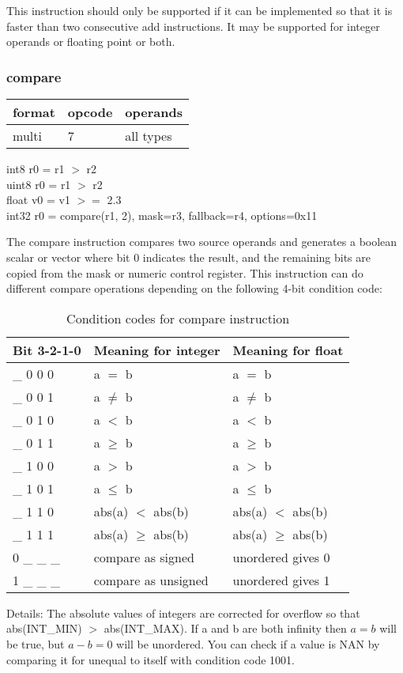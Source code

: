 \documentclass[forwardcom.tex]{subfiles}
\begin{document}
This instruction should only be supported if it can be implemented so that it is faster than two consecutive add instructions. It may be supported for integer operands or floating point or both.

\subsubsection{compare} \label{compare}
\label{table:compareInstruction}
\begin{tabular}{|p{12mm}|p{12mm}|p{110mm}|}
\hline
\bfseries format & \bfseries opcode & \bfseries operands \\ \hline
multi &  7 & all types \\ \hline
\end{tabular}
\vspace{2mm}

int8 r0 = r1 $>$ r2 \\
uint8 r0 = r1 $>$ r2 \\
float v0 = v1 $>=$ 2.3 \\
int32 r0 = compare(r1, 2), mask=r3, fallback=r4, options=0x11
\vspace{2mm}

The compare instruction compares two source operands and generates a boolean scalar or vector where bit 0 indicates the result, and the remaining bits are copied from the mask or numeric control register. This instruction can do different compare operations depending on the following 4-bit condition code:

\begin{longtable} {|p{14mm}|p{55mm}|p{55mm}|}
\caption{Condition codes for compare instruction} 
\label{table:conditionCodesForCompareInstruction} \\
\endfirsthead
\endhead
\hline
\bfseries Bit 3-2-1-0 & \bfseries Meaning for integer & \bfseries Meaning for float \\
\hline
\_ 0 0 0 & a $=$ b & a $=$ b \\
\_ 0 0 1 & a $\neq$ b & a $\neq$ b \\
\_ 0 1 0 & a $<$ b & a $<$ b \\
\_ 0 1 1 & a $\geq$ b & a $\geq$ b \\
\_ 1 0 0 & a $>$ b & a $>$ b \\
\_ 1 0 1 & a $\leq$ b & a $\leq$ b \\
\_ 1 1 0 & abs(a) $<$ abs(b) & abs(a) $<$ abs(b) \\
\_ 1 1 1 & abs(a) $\geq$ abs(b) & abs(a) $\geq$ abs(b) \\
\hline
0 \_ \_ \_ & compare as signed & unordered gives 0 \\
1 \_ \_ \_ & compare as unsigned & unordered gives 1 \\
\hline
\end{longtable}
Details: The absolute values of integers are corrected for overflow so that abs(INT\_MIN) $>$ abs(INT\_MAX).
If a and b are both infinity then $a = b$ will be true, but $a-b = 0$ will be unordered.
You can check if a value is NAN by comparing it for unequal to itself with condition code 1001.
\end{document}
